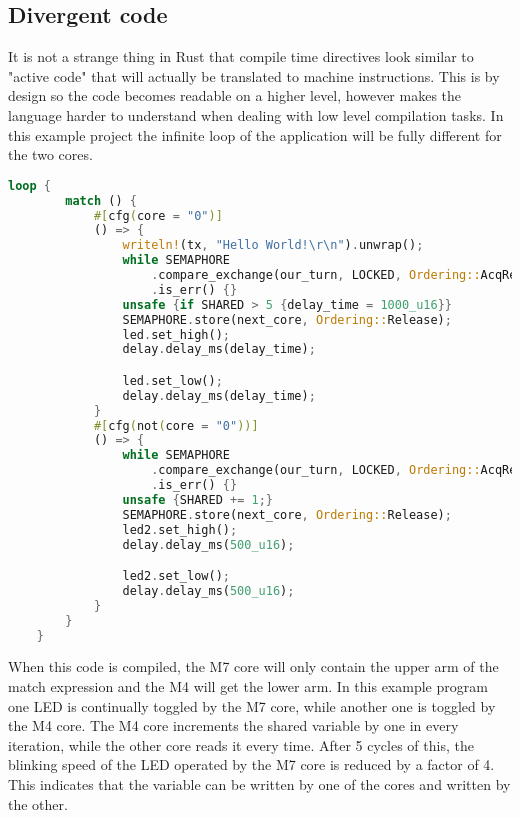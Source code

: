 \subsection{Divergent code}

It is not a strange thing in Rust that compile time directives look similar to "active code" that will actually be translated to machine instructions. This is by design so the code becomes readable on a higher level, however makes the language harder to understand when dealing with low level compilation tasks. In this example project the infinite loop of the application will be fully different for the two cores.

\begin{lstlisting}[language=Rust,frame=single,float=!ht,style=customrust,label={lst:divergent-code},caption={Example of Diverging Code}]
    loop {
        match () {
            #[cfg(core = "0")]
            () => {
                writeln!(tx, "Hello World!\r\n").unwrap();
                while SEMAPHORE
                    .compare_exchange(our_turn, LOCKED, Ordering::AcqRel, Ordering::Relaxed)
                    .is_err() {}
                unsafe {if SHARED > 5 {delay_time = 1000_u16}}
                SEMAPHORE.store(next_core, Ordering::Release);
                led.set_high();
                delay.delay_ms(delay_time);

                led.set_low();
                delay.delay_ms(delay_time);
            }
            #[cfg(not(core = "0"))]
            () => {
                while SEMAPHORE
                    .compare_exchange(our_turn, LOCKED, Ordering::AcqRel, Ordering::Relaxed)
                    .is_err() {}
                unsafe {SHARED += 1;}
                SEMAPHORE.store(next_core, Ordering::Release);
                led2.set_high();
                delay.delay_ms(500_u16);

                led2.set_low();
                delay.delay_ms(500_u16);
            }
        }
    }
\end{lstlisting}

When this code is compiled, the M7 core will only contain the upper arm of the match expression and the M4 will get the lower arm. In this example program one LED is continually toggled by the M7 core, while another one is toggled by the M4 core. The M4 core increments the shared variable by one in every iteration, while the other core reads it every time. After 5 cycles of this, the blinking speed of the LED operated by the M7 core is reduced by a factor of 4. This indicates that the variable can be written by one of the cores and written by the other.

